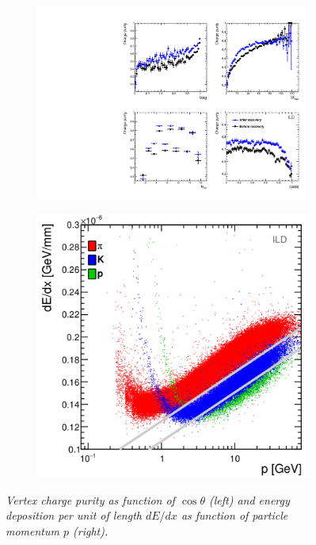 \documentclass{PoS}
\begin{document}
	\begin{figure}
		\centering
		\begin{subfigure}{0.5\textwidth}
			\centering
			\includegraphics[clip, trim=10cm 0cm 0cm 10cm,width=0.95\linewidth]{../poster/plots/purity-recovery-ild.pdf}
			\caption{\label{fig:thetaepsilonsys} }
		\end{subfigure}%
		\begin{subfigure}{0.5\textwidth}
			\centering
			\includegraphics[width=0.87\linewidth]{../poster/plots/dedx2.png}
			\caption{\label{fig:lepsilonsys} }
		\end{subfigure}
		\caption{\label{fig:Charges_3} \sl Vertex charge purity as function of $\cos\theta$ (left) and energy deposition per unit of length $dE/dx$ as function of particle momentum $p$ (right).}
	\end{figure}
	
\end{document}
